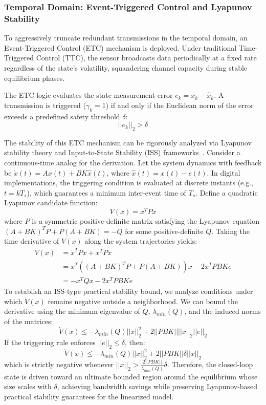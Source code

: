 \subsubsection{Temporal Domain: Event-Triggered Control and Lyapunov Stability}
To aggressively truncate redundant transmissions in the temporal domain, an Event-Triggered Control (ETC) mechanism is deployed. Under traditional Time-Triggered Control (TTC), the sensor broadcasts data periodically at a fixed rate regardless of the state's volatility, squandering channel capacity during stable equilibrium phases.

The ETC logic evaluates the state measurement error $e_k = x_k - \hat{x}_k$. A transmission is triggered ($\gamma_k = 1$) if and only if the Euclidean norm of the error exceeds a predefined safety threshold $\delta$:
\begin{equation}
    ||e_k||_2 > \delta
\end{equation}

The stability of this ETC mechanism can be rigorously analyzed via Lyapunov stability theory and Input-to-State Stability (ISS) frameworks~\cite{AIETSC,DTMEC}. Consider a continuous-time analog for the derivation. Let the system dynamics with feedback be $\dot{x}(t) = A x(t) + B K \hat{x}(t)$, where $\hat{x}(t) = x(t) - e(t)$. In digital implementations, the triggering condition is evaluated at discrete instants (e.g., $t=kT_s$), which guarantees a minimum inter-event time of $T_s$.
Define a quadratic Lyapunov candidate function:
\begin{equation}
    V(x) = x^T P x
\end{equation}
where $P$ is a symmetric positive-definite matrix satisfying the Lyapunov equation $(A+BK)^T P + P(A+BK) = -Q$ for some positive-definite $Q$. 
Taking the time derivative of $V(x)$ along the system trajectories yields:
\begin{align}
    \dot{V}(x) &= \dot{x}^T P x + x^T P \dot{x} \\
               &= x^T ((A+BK)^T P + P(A+BK)) x - 2 x^T P B K e \\
               &= -x^T Q x - 2 x^T P B K e
\end{align}
To establish an ISS-type practical stability bound, we analyze conditions under which $\dot{V}(x)$ remains negative outside a neighborhood. We can bound the derivative using the minimum eigenvalue of $Q$, $\lambda_{min}(Q)$, and the induced norms of the matrices:
\begin{equation}
    \dot{V}(x) \le -\lambda_{min}(Q) ||x||_2^2 + 2 ||P B K|| ||x||_2 ||e||_2
\end{equation}
If the triggering rule enforces $||e||_2 \le \delta$, then:
\begin{equation}
    \dot{V}(x) \le -\lambda_{min}(Q) ||x||_2^2 + 2 ||P B K|| \delta ||x||_2
\end{equation}
which is strictly negative whenever $||x||_2 > \frac{2||P B K||}{\lambda_{min}(Q)} \delta$. Therefore, the closed-loop state is driven toward an ultimate bounded region around the equilibrium whose size scales with $\delta$, achieving bandwidth savings while preserving Lyapunov-based practical stability guarantees for the linearized model.

